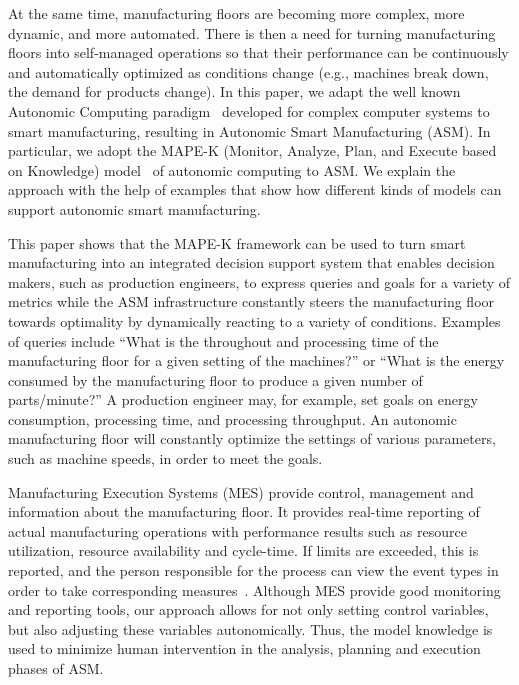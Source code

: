 \documentclass[a4paper, 12pt]{article} %
\begin{document}
At the same time, manufacturing floors are becoming more complex, more dynamic, and more automated. There is then a need for turning manufacturing floors into self-managed operations so that their performance can be continuously and automatically optimized as conditions change (e.g., machines break down, the  demand for products change). In this paper, we adapt the well known Autonomic Computing paradigm~\cite{ACVision} developed for complex computer systems to smart manufacturing, resulting in  Autonomic Smart Manufacturing (ASM). In particular, we adopt the MAPE-K (Monitor, Analyze, Plan, and Execute based on Knowledge) model~\cite{ACVision}
of autonomic computing to ASM. We explain the approach  with the help of examples that show how different  kinds of models can support autonomic smart manufacturing. 

This paper shows that the MAPE-K framework can be used to turn smart manufacturing into an integrated decision support system that enables decision makers, such as production engineers, to express queries and goals for a variety of metrics  while the ASM infrastructure constantly steers the manufacturing floor towards optimality by dynamically reacting to a variety of conditions. Examples of queries include ``What is the throughout and processing time of the 
manufacturing floor for a given setting of the machines?'' or ``What is the energy consumed by the manufacturing floor to produce a given number of parts/minute?'' A production engineer may, for example, set goals on energy consumption, processing time, and processing throughput. An autonomic manufacturing floor will constantly optimize the settings of various parameters, such as machine speeds, in order to meet the goals. 

Manufacturing Execution Systems (MES) provide control, management and information about the manufacturing floor. It provides real-time reporting of actual manufacturing operations with performance results such as resource utilization, resource availability and cycle-time. If limits are exceeded, this is reported, and the person responsible for the process can view the event types in order to take corresponding measures~\cite{Meyer2009}\cite{Dhandapani2006}\cite{McClellan1997}. Although MES provide good monitoring and reporting tools, our approach allows for not only setting  control variables, but also adjusting these variables autonomically. Thus, the model knowledge is used to minimize human intervention in the analysis, planning and execution phases of ASM. 
\end{document}
